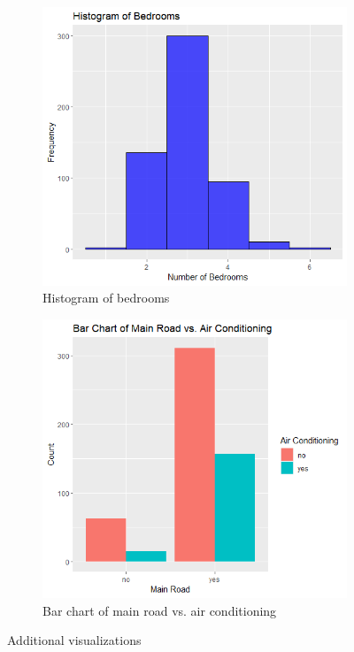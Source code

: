 \documentclass[10pt]{article}
\begin{document}
\begin{figure}[H]
  \centering
  \begin{subfigure}{0.25\textwidth}
    \includegraphics[width=\linewidth]{Final project/Visualizations/Histogram.png}
    \caption{Histogram of bedrooms}
    \label{fig:2a}
  \end{subfigure}
  \begin{subfigure}{0.25\textwidth}
    \includegraphics[width=\linewidth]{Final project/Visualizations/Bar chart.png}
    \caption{Bar chart of main road vs. air conditioning}
    \label{fig:2b}
  \end{subfigure}
  \caption{Additional visualizations}
  \label{fig:2}
\end{figure}
\end{document}
